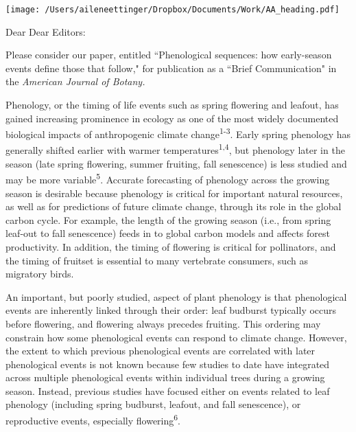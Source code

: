 \documentclass[10.95pt,a4paper]{letter}
\begin{document}
%

\begin{letter}{}
\texttt{[image: /Users/aileneettinger/Dropbox/Documents/Work/AA\_heading.pdf]}

\opening{Dear Dear Editors:}
Please consider our paper, entitled ``Phenological sequences: how early-season events define those that follow," for publication as a ``Brief Communication" in the \emph{American Journal of Botany.}

Phenology, or the timing of life events such as spring flowering and leafout, has gained increasing prominence in ecology as one of the most widely documented biological impacts of anthropogenic climate change\textsuperscript{1-3}. Early spring phenology has generally shifted earlier with warmer temperatures\textsuperscript{1,4}, but phenology later in the season (late spring flowering, summer fruiting, fall senescence) is less studied and may be more variable\textsuperscript{5}.  Accurate forecasting of phenology across the growing season is desirable because phenology is critical for important natural resources, as well as for predictions of future climate change, through its role in the global carbon cycle. For example, the length of the growing season (i.e., from spring leaf-out to fall senescence) feeds in to global carbon models and affects forest productivity. In addition, the timing of flowering is critical for pollinators, and the timing of fruitset is essential to many vertebrate consumers, such as migratory birds. 

An important, but poorly studied, aspect of plant phenology is that phenological events are inherently linked through their order: leaf budburst typically occurs before flowering, and flowering always precedes fruiting. This ordering may constrain how some phenological events can respond to climate change. However, the extent to which previous phenological events are correlated with later phenological events is not known because few studies to date have integrated across multiple phenological events within individual trees during a growing season. Instead, previous studies have focused either on events related to leaf phenology (including spring budburst, leafout, and fall senescence), or reproductive events, especially flowering\textsuperscript{6}. 



\end{letter}
\end{document}
